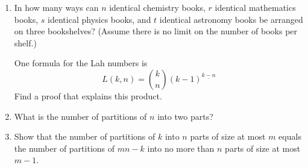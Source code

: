 {\begin{enumerate}
\begin{enumerate}
\item In how many ways can they distribute all the trees if they are
identical and anyone may receive any number of trees?
\label{multisetproblem}

\item  In how many ways can all the trees be distributed and planted if
the trees are distinct, any family can get any number, and a family must
plant its trees in an evenly spaced row along the road? 
\label{orderedfunctionproblem}

\item  Answer the question in Part \ref{orderedfunctionproblem}
assuming that every family must get a tree.

\item  Answer the question in Part \ref{multisetproblem} assuming that
each family must get at least one tree.
\end{enumerate}

\item  In how many ways can $n$ identical chemistry books, $r$ identical
mathematics books, $s$ identical physics books, and $t$ identical astronomy books
be arranged on three bookshelves?
(Assume there is no limit on the number of books per shelf.)


\itemi One formula for the Lah numbers is
$$L(k,n) = {k\choose n}(k-1)^{\underline{k-n}}$$ 
Find a proof that explains this product.

\item What is the number of partitions of $n$ into two parts?

\item Show that the number of partitions of $k$ into $n$ parts of size at
most $m$ equals the number of partitions of $mn-k$ into no more than $n$
parts of size at most $m-1$.


\end{enumerate}}
